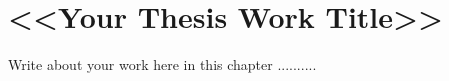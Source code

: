 
\setcounter{secnumdepth}{5}
\chapter{<<Your Thesis Work Title>>}
\thispagestyle{empty}
\glsresetall
\label{Chapter3}


Write about your work here in this chapter ..........

\newpage